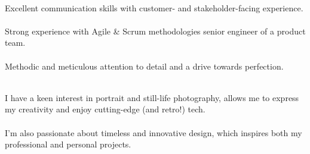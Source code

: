 \documentclass[8pt]{developercv} %
\begin{document}
\vspace{0.5cm}
\begin{minipage}[t]{0.45\textwidth}
	\vspace{-\baselineskip} %

	\\
	Excellent communication skills with customer- and stakeholder-facing experience.\\\\Strong experience with Agile \& Scrum methodologies  senior engineer of a product team.\\\\Methodic and meticulous attention to detail and a drive towards perfection.
\end{minipage}
\hfill
\begin{minipage}[t]{0.45\textwidth}
	\vspace{-\baselineskip} %
	
	\\
	 I have a keen interest in portrait and still-life photography,  allows me to express my creativity and enjoy cutting-edge (and retro!) tech.\\\\I'm also passionate about timeless and innovative design, which inspires both my professional and personal projects.
\end{minipage}


\end{document}
